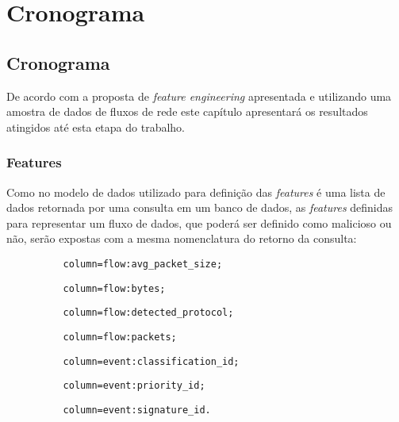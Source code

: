 \part{Cronograma}
\chapter[Cronograma]{Cronograma}

    De acordo com a proposta de \textit{feature engineering} apresentada e utilizando uma amostra de dados de fluxos de rede este capítulo apresentará os resultados atingidos até esta etapa do trabalho.

    \section{Features}
        Como no modelo de dados utilizado para definição das \textit{features} é uma lista de dados retornada por uma consulta em um banco de dados, as \textit{features} definidas para representar um fluxo de dados, que poderá ser definido como malicioso ou não, serão expostas com a mesma nomenclatura do retorno da consulta:
        \\
        \begin{lstlisting}
          column=flow:avg_packet_size;
        \end{lstlisting}

        \begin{lstlisting}
          column=flow:bytes;
        \end{lstlisting}

        \begin{lstlisting}
          column=flow:detected_protocol;
        \end{lstlisting}

        \begin{lstlisting}
          column=flow:packets;
        \end{lstlisting}

        \begin{lstlisting}
          column=event:classification_id;
        \end{lstlisting}

        \begin{lstlisting}
          column=event:priority_id;
        \end{lstlisting}

        \begin{lstlisting}
          column=event:signature_id.
        \end{lstlisting}


